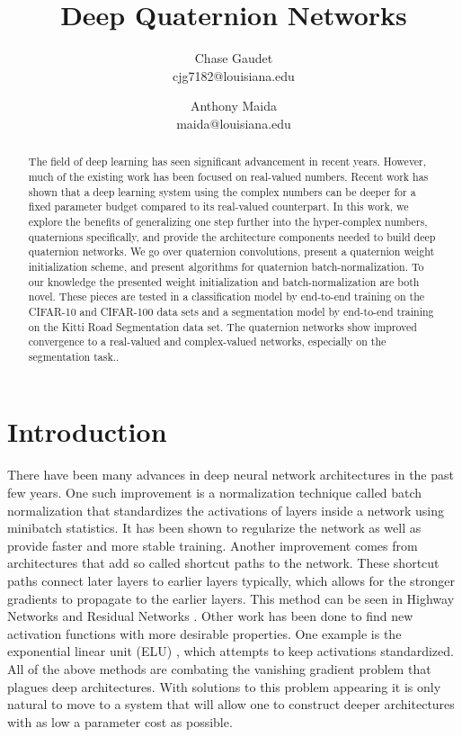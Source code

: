 \documentclass[14pt,a4paper]{article}
\begin{document}
\title{Deep Quaternion Networks}
\author{Chase Gaudet \\  cjg7182@louisiana.edu
   \and Anthony Maida \\  maida@louisiana.edu}
\maketitle

\begin{abstract}
The field of deep learning has seen significant advancement in recent years.
However, much of the existing work has been focused on real-valued numbers.
Recent work has shown that a deep learning system using the complex numbers can be deeper for a fixed parameter budget compared to its real-valued counterpart.
In this work, we explore the benefits of generalizing one step further into the hyper-complex numbers, quaternions specifically, and provide the architecture components needed to build deep quaternion networks.
We go over quaternion convolutions, present a quaternion weight initialization scheme, and present algorithms for quaternion batch-normalization.
To our knowledge the presented weight initialization and batch-normalization are both novel.
These pieces are tested in a classification model by end-to-end training on the CIFAR-10 and CIFAR-100 data sets and a segmentation model by end-to-end training on the Kitti Road Segmentation data set. 
The quaternion networks show improved convergence to a real-valued and complex-valued networks, especially on the segmentation task..
\end{abstract}


\section{Introduction}
There have been many advances in deep neural network architectures in the past few years.
One such improvement is a normalization technique called batch normalization \cite{ioffe2015batch} that standardizes the activations of layers inside a network using minibatch statistics.
It has been shown to regularize the network as well as provide faster and more stable training.
Another improvement comes from architectures that add so called shortcut paths to the network.
These shortcut paths connect later layers to earlier layers typically, which allows for the stronger gradients to propagate to the earlier layers.
This method can be seen in Highway Networks \cite{srivastava2015training} and Residual Networks  \cite{he2016deep}.
Other work has been done to find new activation functions with more desirable properties.
One example is the exponential linear unit (ELU) \cite{clevert2015fast}, which attempts to keep activations standardized.
All of the above methods are combating the vanishing gradient problem \cite{hochreiter1991untersuchungen} that plagues deep architectures.
With solutions to this problem appearing it is only natural to move to a system that will allow one to construct deeper architectures with as low a parameter cost as possible.
\end{document}
